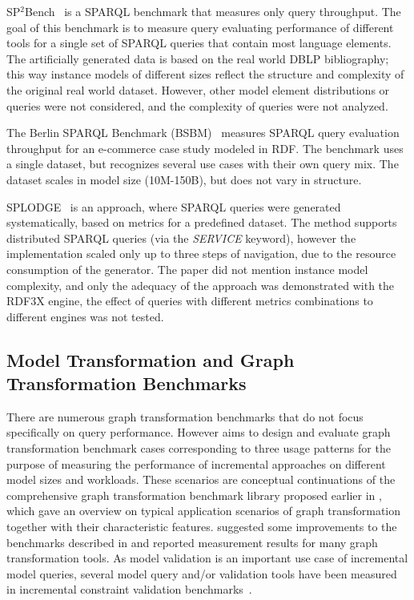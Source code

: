 SP$^{2}$Bench~\cite{SP2Bench} is a SPARQL benchmark that measures only
query throughput. The goal of this benchmark is to measure query evaluating
performance of different tools for a single set of SPARQL queries that contain most language
elements. The artificially generated data is based on the real world
DBLP bibliography; this way instance models of different sizes reflect the
structure and complexity of the original real world dataset. However, other
model element distributions or queries were not considered, and the complexity of queries
were not analyzed.

The Berlin SPARQL Benchmark (BSBM)~\cite{BSBM} measures SPARQL query evaluation throughput for an
e-commerce case study modeled in RDF. The benchmark uses a single dataset, but recognizes several use cases with their own query mix. The dataset scales in model size (10M-150B), but does not vary in structure.  

SPLODGE~\cite{SPLODGE} is an approach, where SPARQL queries were generated
systematically, based on metrics for a predefined dataset. The method supports distributed
SPARQL queries (via the \emph{SERVICE} keyword), however the implementation
scaled only up to three steps of navigation, due to the resource consumption of the
generator. The paper did not mention instance model complexity, and only the
adequacy of the approach was demonstrated with the RDF3X engine, the effect of
queries with different metrics combinations to different engines was not tested.

\subsection{Model Transformation and Graph Transformation Benchmarks}

There are numerous graph transformation benchmarks that do not focus specifically on query performance. However \cite{icgt08-bhrv} aims to design and evaluate graph transformation benchmark cases corresponding to three usage patterns for the purpose of measuring the performance of incremental approaches on different model sizes and workloads. These scenarios are conceptual continuations of the comprehensive graph transformation benchmark library proposed earlier in \cite{vlhcc05_vsv}, which gave an overview on typical application scenarios of graph transformation together with their characteristic features. \cite{GK:07} suggested some improvements to the benchmarks described in \cite{vlhcc05_vsv} and reported measurement results for many graph transformation tools. 
As model validation is an important use case of incremental model queries, several model query and/or validation tools have been measured in incremental constraint validation benchmarks~\cite{Egyed-incConsistency,falleri-praxis,models10}. 
